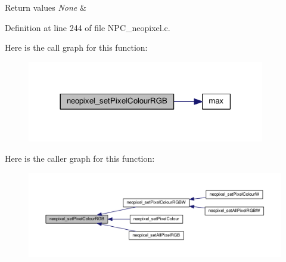 \begin{DoxyRetVals}{Return values}
{\em None} & \\
\hline
\end{DoxyRetVals}


Definition at line 244 of file N\+P\+C\+\_\+neopixel.\+c.



Here is the call graph for this function\+:\nopagebreak
\begin{figure}[H]
\begin{center}
\leavevmode
\includegraphics[width=294pt]{d5/d15/group___neo_pixel___display_ga63c196a71ffb007411929e41ba5df41d_cgraph}
\end{center}
\end{figure}




Here is the caller graph for this function\+:\nopagebreak
\begin{figure}[H]
\begin{center}
\leavevmode
\includegraphics[width=350pt]{d5/d15/group___neo_pixel___display_ga63c196a71ffb007411929e41ba5df41d_icgraph}
\end{center}
\end{figure}



